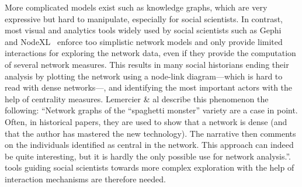 More complicated models exist such as knowledge graphs\cite{opitzInductionLargeScaleKnowledge2018}, which are very expressive but hard to manipulate, especially for social scientists.
In contrast, most visual and analytics tools widely used by social scientists such as Gephi~\cite{Gephi} and NodeXL~\cite{NodeXL} enforce too simplistic network models and only provide limited interactions for exploring the network data, even if they provide the computation of several network measures.
This results in many social historians ending their analysis by plotting the network using a node-link diagram---which is hard to read with dense networks---, and identifying the most important actors with the help of centrality measures\cite{lemercierQuantitativeMethodsHumanities2019}.
Lemercier \& al describe this phenomenon the following: ``Network graphs of the “spaghetti monster” variety are a case in point. Often, in historical papers, they are used to show that a network is dense (and that the author has mastered the new technology). The narrative then comments on the individuals identified as central in the network. This approach can indeed be quite interesting, but it is hardly the only possible use for network analysis.\cite{lemercierQuantitativeMethodsHumanities2019}''.
\va tools guiding social scientists towards more complex exploration with the help of interaction mechanisms are therefore needed.

